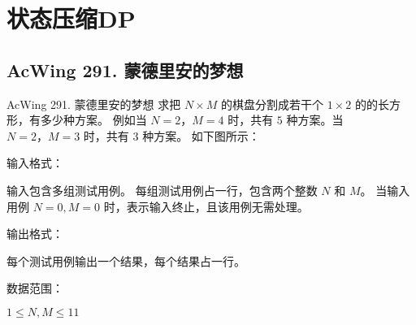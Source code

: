 \section{状态压缩DP}

\subsection{AcWing 291. 蒙德里安的梦想}
\begin{titledbox}{AcWing 291. 蒙德里安的梦想}
    求把 $N \times M$ 的棋盘分割成若干个 $1 \times 2$ 的的长方形，有多少种方案。 例如当 $N=2，M=4$ 时，共有 $5$ 种方案。当 $N=2，M=3$ 时，共有 $3$ 种方案。 如下图所示：


    输入格式：

    输入包含多组测试用例。 每组测试用例占一行，包含两个整数 $N$ 和 $M$。 当输入用例 $N=0, M=0$ 时，表示输入终止，且该用例无需处理。

    输出格式：

    每个测试用例输出一个结果，每个结果占一行。

    数据范围：

    $1 \le N,M \le 11$

    \begin{inputblock}
         \\
         \\
         \\
         \\
         \\
         \\
         \\
         \\
    \end{inputblock}
    \begin{outputblock}
    \end{outputblock}
\end{titledbox}

